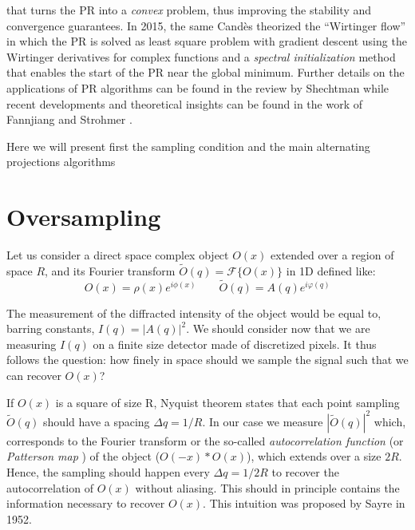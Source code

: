that turns the PR into a \textit{convex} problem, thus improving the stability and convergence guarantees. In 2015, the same 
Cand{\`e}s \cite{CandesLiSoltanolkotabi2015} theorized the ``Wirtinger flow'' in which the PR is solved as least square 
problem with gradient descent using the Wirtinger derivatives \cite{Wirtinger1927} for complex functions and a \textit{spectral initialization} 
method that enables the start of the PR near the global minimum. Further details on the applications of PR algorithms 
can be found in the review by Shechtman \cite{Miao_2015ReviewPhaseRetrieval} while recent developments and theoretical 
insights can be found in the work of Fannjiang and Strohmer \cite{Fannjiang2020}. 

Here we will present first the sampling condition and the main alternating projections algorithms 

\section{Oversampling}\label{sec:oversampling}

Let us consider a direct space complex object $O(x) $ extended over a region of space $R$, and its Fourier transform 
$ \widetilde{O}(q) =\mathcal{F}\{ O(x)\}$ in 1D defined like: 
\begin{equation}
    O(x) = \rho(x)e^{i\phi(x)} \qquad \widetilde{O}(q) = A(q)e^{i\varphi(q)}
\end{equation}

The measurement of the diffracted intensity of the object would be equal to, barring constants, $I(q) = |A(q)|^2$. 
We should consider now that we are measuring $I(q)$ on a finite size detector made of discretized pixels. It thus 
follows the question: how finely in space should we sample the signal such that we can recover $O(x)$? 

If $O(x) $ is a square of size R, Nyquist theorem states that each point sampling $ \widetilde{O}(q)$ should have a 
spacing $ \Delta q = 1/R$. In our case we measure $|\widetilde{O}(q)|^2$ which, corresponds to the Fourier transform or the 
so-called \textit{autocorrelation function} (or \textit{Patterson map} \cite{Patterson1937}) of the object ($O(-x)\ast O(x)$), which extends over a size $2R$. Hence, the sampling should 
happen every $ \Delta q = 1/2R$ to recover the autocorrelation of $O(x) $ without aliasing. This should in principle 
contains the information necessary to recover $O(x) $. This intuition was proposed by Sayre in 1952.

